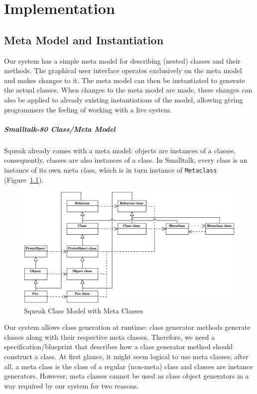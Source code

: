 \chapter{Implementation}

\section{Meta Model and Instantiation}
\label{sec:impl_meta_model}
Our system has a simple meta model for describing (nested) classes and their methods. The graphical user interface operates exclusively on the meta model and makes changes to it. The meta model can then be instantiated to generate the actual classes. When changes to the meta model are made, these changes can also be applied to already existing instantiations of the model, allowing giving programmers the feeling of working with a live system.

\paragraph{Smalltalk-80 Class/Meta Model}
Squeak already comes with a meta model: objects are instances of a classes, consequently, classes are also instances of a class. In Smalltalk, every class is an instance of its own meta class, which is in turn instance of \texttt{Metaclass} (Figure~\ref{fig:impl_squeak_meta}).

\begin{figure}
	\includegraphics[width=\textwidth]{squeak_meta.pdf}
	\centering
	\caption{Squeak Class Model with Meta Classes}
	\label{fig:impl_squeak_meta}
\end{figure}

Our system allows class generation at runtime: class generator methods generate classes along with their respective meta classes. Therefore, we need a specification/blueprint that describes how a class generator method should construct a class. At first glance, it might seem logical to use meta classes; after all, a meta class is the class of a regular (non-meta) class and classes are instance generators. However, meta classes cannot be used as class object generators in a way required by our system for two reasons.

